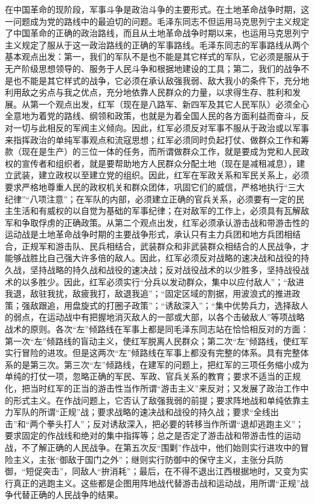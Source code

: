 在中国革命的现阶段，军事斗争是政治斗争的主要形式。在土地革命战争时期，这一问题成为党的路线中的最迫切的问题。毛泽东同志不但运用马克思列宁主义规定了中国革命的正确的政治路线，而且从土地革命战争时期以来，也运用马克思列宁主义规定了服从于这一政治路线的正确的军事路线。毛泽东同志的军事路线从两个基本观点出发：第一，我们的军队不是也不能是其它样式的军队，它必须是服从于无产阶级思想领导的、服务于人民斗争和根据地建设的工具；第二，我们的战争不是也不能是其它样式的战争，它必须在承认敌强我弱、敌大我小的条件下，充分地利用敌之劣点与我之优点，充分地依靠人民群众的力量，以求得生存、胜利和发展。从第一个观点出发，红军（现在是八路军、新四军及其它人民军队）必须全心全意地为着党的路线、纲领和政策，也就是为着全国人民的各方面利益而奋斗，反对一切与此相反的军阀主义倾向。因此，红军必须反对军事不服从于政治或以军事来指挥政治的单纯军事观点和流寇思想；红军必须同时负起打仗、做群众工作和筹款（现在是生产）的三位一体的任务，而所谓做群众工作，就是要成为党和人民政权的宣传者和组织者，就是要帮助地方人民群众分配土地（现在是减租减息），建立武装，建立政权以至建立党的组织。因此，红军在军政关系和军民关系上，必须要求严格地尊重人民的政权机关和群众团体，巩固它们的威信，严格地执行“三大纪律”“八项注意”；在军队的内部，必须建立正确的官兵关系，必须要有一定的民主生活和有威权的以自觉为基础的军事纪律；在对敌军的工作上，必须具有瓦解敌军和争取俘虏的正确政策。从第二个观点出发，红军必须承认游击战和带游击性的运动战是土地革命战争时期的主要战争形式，承认只有主力兵团和地方兵团相结合，正规军和游击队、民兵相结合，武装群众和非武装群众相结合的人民战争，才能够战胜比自己强大许多倍的敌人。因此，红军必须反对战略的速决战和战役的持久战，坚持战略的持久战和战役的速决战；反对战役战术的以少胜多，坚持战役战术的以多胜少。因此，红军必须实行“分兵以发动群众，集中以应付敌人”；“敌进我退，敌驻我扰，敌疲我打，敌退我追”；“固定区域的割据，用波浪式的推进政策；强敌跟追，用盘旋式的打圈子政策”；“诱敌深入”；“集中优势兵力，选择敌人的弱点，在运动战中有把握地消灭敌人的一部或大部，以各个击破敌人”等项战略战术的原则。各次“左”倾路线在军事上都是同毛泽东同志站在恰恰相反对的方面：第一次“左”倾路线的盲动主义，使红军脱离人民群众；第二次“左”倾路线，使红军实行冒险的进攻。但是这两次“左”倾路线在军事上都没有完整的体系。具有完整体系的是第三次。第三次“左”倾路线，在建军的问题上，把红军的三项任务缩小成为单纯的打仗一项，忽略正确的军民、军政、官兵关系的教育；要求不适当的正规化，把当时红军的正当的游击性当作所谓“游击主义”来反对；又发展了政治工作中的形式主义。在作战问题上，它否认了敌强我弱的前提；要求阵地战和单纯依靠主力军队的所谓“正规”战；要求战略的速决战和战役的持久战；要求“全线出击”和“两个拳头打人”；反对诱敌深入，把必要的转移当作所谓“退却逃跑主义”；要求固定的作战线和绝对的集中指挥等；总之是否定了游击战和带游击性的运动战，不了解正确的人民战争。在第五次反“围剿”作战中，他们始则实行进攻中的冒险主义，主张“御敌于国门之外”；继则实行防御中的保守主义，主张分兵防御，“短促突击”，同敌人“拚消耗”；最后，在不得不退出江西根据地时，又变为实行真正的逃跑主义。这些都是企图用阵地战代替游击战和运动战，用所谓“正规”战争代替正确的人民战争的结果。

